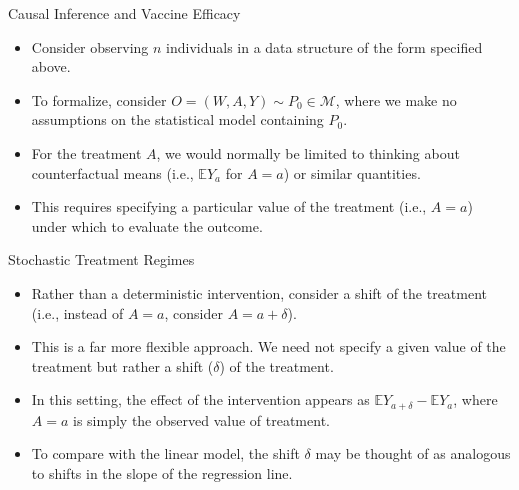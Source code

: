 \documentclass[12pt,t]{beamer}
\newcommand{\E}{\mathbb{E}}
\begin{document}

\begin{frame}[c]{Causal Inference and Vaccine Efficacy}

\begin{center}
\begin{itemize}
  \itemsep10pt
  \item Consider observing $n$ individuals in a data structure of the form
    specified above.
  \item To formalize, consider $O = (W, A, Y) \sim P_0 \in \mathcal{M}$, where
    we make no assumptions on the statistical model containing $P_0$.
  \item For the treatment $A$, we would normally be limited to thinking about
    counterfactual means (i.e., $\E Y_a$ for $A = a$) or similar quantities.
  \item This requires specifying a particular value of the treatment (i.e.,
    $A = a$) under which to evaluate the outcome.
\end{itemize}
\end{center}

\note{
}

\end{frame}


\begin{frame}[c]{Stochastic Treatment Regimes}

\begin{center}
\begin{itemize}
  \itemsep10pt
  \item Rather than a deterministic intervention, consider a shift of the
    treatment (i.e., instead of $A = a$, consider $A = a + \delta$).
  \item This is a far more flexible approach. We need not specify a given value
    of the treatment but rather a shift ($\delta$) of the treatment.
  \item In this setting, the effect of the intervention appears as $\E Y_{a +
    \delta} - \E Y_a$, where $A = a$ is simply the observed value of
    treatment.
  \item To compare with the linear model, the shift $\delta$ may be thought of
    as analogous to shifts in the slope of the regression line.
\end{itemize}
\end{center}

\note{
}

\end{frame}
\end{document}
